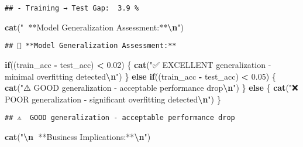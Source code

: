 \documentclass[
]{article}
\newenvironment{Shaded}{\begin{snugshade}}{\end{snugshade}}
\newcommand{\ControlFlowTok}[1]{\textcolor[rgb]{0.13,0.29,0.53}{\textbf{#1}}}
\newcommand{\FloatTok}[1]{\textcolor[rgb]{0.00,0.00,0.81}{#1}}
\newcommand{\FunctionTok}[1]{\textcolor[rgb]{0.13,0.29,0.53}{\textbf{#1}}}
\newcommand{\NormalTok}[1]{#1}
\newcommand{\SpecialCharTok}[1]{\textcolor[rgb]{0.81,0.36,0.00}{\textbf{#1}}}
\newcommand{\StringTok}[1]{\textcolor[rgb]{0.31,0.60,0.02}{#1}}
\begin{document}
\begin{verbatim}
## - Training → Test Gap:  3.9 %
\end{verbatim}

\begin{Shaded}
\begin{Highlighting}[]
\FunctionTok{cat}\NormalTok{(}\StringTok{"🎯 **Model Generalization Assessment:**}\SpecialCharTok{\textbackslash{}n}\StringTok{"}\NormalTok{)}
\end{Highlighting}
\end{Shaded}

\begin{verbatim}
## 🎯 **Model Generalization Assessment:**
\end{verbatim}

\begin{Shaded}
\begin{Highlighting}[]
\ControlFlowTok{if}\NormalTok{((train\_acc }\SpecialCharTok{{-}}\NormalTok{ test\_acc) }\SpecialCharTok{\textless{}} \FloatTok{0.02}\NormalTok{) \{}
  \FunctionTok{cat}\NormalTok{(}\StringTok{"✅ EXCELLENT generalization {-} minimal overfitting detected}\SpecialCharTok{\textbackslash{}n}\StringTok{"}\NormalTok{)}
\NormalTok{\} }\ControlFlowTok{else} \ControlFlowTok{if}\NormalTok{((train\_acc }\SpecialCharTok{{-}}\NormalTok{ test\_acc) }\SpecialCharTok{\textless{}} \FloatTok{0.05}\NormalTok{) \{}
  \FunctionTok{cat}\NormalTok{(}\StringTok{"⚠️  GOOD generalization {-} acceptable performance drop}\SpecialCharTok{\textbackslash{}n}\StringTok{"}\NormalTok{)}
\NormalTok{\} }\ControlFlowTok{else}\NormalTok{ \{}
  \FunctionTok{cat}\NormalTok{(}\StringTok{"❌ POOR generalization {-} significant overfitting detected}\SpecialCharTok{\textbackslash{}n}\StringTok{"}\NormalTok{)}
\NormalTok{\}}
\end{Highlighting}
\end{Shaded}

\begin{verbatim}
## ⚠️  GOOD generalization - acceptable performance drop
\end{verbatim}

\begin{Shaded}
\begin{Highlighting}[]
\FunctionTok{cat}\NormalTok{(}\StringTok{"}\SpecialCharTok{\textbackslash{}n}\StringTok{💼 **Business Implications:**}\SpecialCharTok{\textbackslash{}n}\StringTok{"}\NormalTok{)}
\end{Highlighting}
\end{Shaded}
\end{document}
